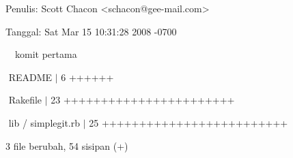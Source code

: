 \noindent 
 \hspace*{0.5in} Penulis: Scott Chacon <schacon@gee-mail.com> \par
\noindent 
 \hspace*{0.5in} Tanggal: Sat Mar 15 10:31:28 2008 -0700 \par
\noindent 
 \hspace*{0.5in}  $  $ $  $ $  $ $  $komit pertama \par
\noindent 
 $  $ \hspace*{0.5in}  \hspace*{0.5in} README  $  \vert  $ 6 ++++++ \par
\noindent 
 \hspace*{0.5in}  $  $ \hspace*{0.5in} Rakefile  $  \vert  $ 23 +++++++++++++++++++++++ \par
\noindent 
 $  $ \hspace*{0.5in}  \hspace*{0.5in} lib / simplegit.rb  $  \vert  $ 25 +++++++++++++++++++++++++ \par
\noindent 
 \hspace*{0.5in}  \hspace*{0.5in}  $  $3 file berubah, 54 sisipan (+) \par

